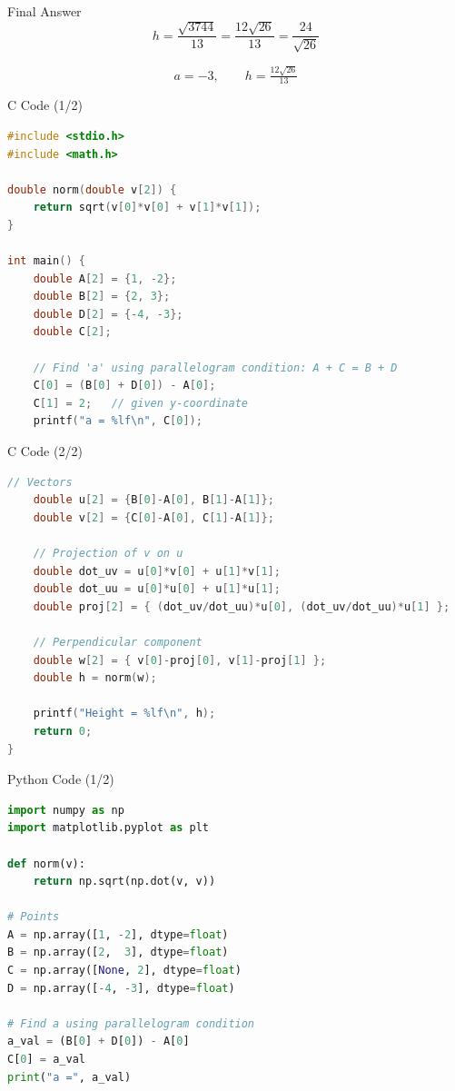 \documentclass{beamer}
\begin{document}
\begin{frame}{Final Answer}
\[
h=\frac{\sqrt{3744}}{13}
=\frac{12\sqrt{26}}{13}
=\frac{24}{\sqrt{26}}
\]

\[
\boxed{a=-3},\qquad \boxed{h=\tfrac{12\sqrt{26}}{13}}
\]
\end{frame}
\begin{frame}[fragile]{C Code (1/2)}
\begin{lstlisting}[language=C]
#include <stdio.h>
#include <math.h>

double norm(double v[2]) {
    return sqrt(v[0]*v[0] + v[1]*v[1]);
}

int main() {
    double A[2] = {1, -2};
    double B[2] = {2, 3};
    double D[2] = {-4, -3};
    double C[2];
    
    // Find 'a' using parallelogram condition: A + C = B + D
    C[0] = (B[0] + D[0]) - A[0];
    C[1] = 2;   // given y-coordinate
    printf("a = %lf\n", C[0]);
\end{lstlisting}
\end{frame}

\begin{frame}[fragile]{C Code (2/2)}
\begin{lstlisting}[language=C]
    // Vectors
    double u[2] = {B[0]-A[0], B[1]-A[1]};
    double v[2] = {C[0]-A[0], C[1]-A[1]};
    
    // Projection of v on u
    double dot_uv = u[0]*v[0] + u[1]*v[1];
    double dot_uu = u[0]*u[0] + u[1]*u[1];
    double proj[2] = { (dot_uv/dot_uu)*u[0], (dot_uv/dot_uu)*u[1] };
    
    // Perpendicular component
    double w[2] = { v[0]-proj[0], v[1]-proj[1] };
    double h = norm(w);
    
    printf("Height = %lf\n", h);
    return 0;
}
\end{lstlisting}
\end{frame}

    


\begin{frame}[fragile]{Python Code (1/2)}
\begin{lstlisting}[language=Python]
import numpy as np
import matplotlib.pyplot as plt

def norm(v):
    return np.sqrt(np.dot(v, v))

# Points
A = np.array([1, -2], dtype=float)
B = np.array([2,  3], dtype=float)
C = np.array([None, 2], dtype=float)
D = np.array([-4, -3], dtype=float)

# Find a using parallelogram condition
a_val = (B[0] + D[0]) - A[0]
C[0] = a_val
print("a =", a_val)
\end{lstlisting}
\end{frame}
\end{document}
